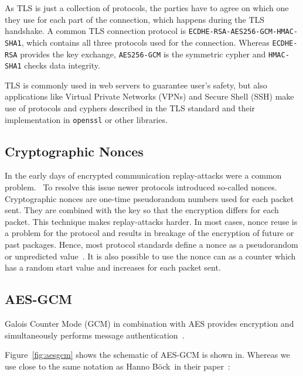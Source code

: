 As TLS is just a collection of protocols, the parties have to agree on which one
they use for each part of the connection, which happens during the TLS
handshake. A common TLS connection protocol is
\texttt{ECDHE-RSA-AES256-GCM-HMAC-SHA1}, which contains all three protocols used
for the connection. Whereas \texttt{ECDHE-RSA} provides the key exchange,
\texttt{AES256-GCM} is the  symmetric cypher and \texttt{HMAC-SHA1} checks data
integrity.

TLS is commonly used in web servers to guarantee user's safety, but also
applications like Virtual Private Networks (VPNs) and Secure Shell (SSH) make
use of protocols and cyphers described in the TLS standard and their
implementation in \texttt{openssl} or other libraries.


\subsection{Cryptographic Nonces}

In the early days of encrypted communication replay-attacks were a common
problem.~ To resolve this issue newer
protocols introduced so-called nonces. Cryptographic nonces are one-time
pseudorandom numbers used for each packet sent. They are combined with the key
so that the encryption differs for each packet. This technique makes
replay-attacks harder. In most cases, nonce reuse is a problem for the protocol
and results in breakage of the encryption of future or past packages. Hence,
most protocol standards define a nonce as a pseudorandom or unpredicted
value~\cite{noncegeneral}. It is also possible to use the nonce can as a counter
which has a random start value and increases for each packet sent.

\subsection{AES-GCM}

Galois Counter Mode (GCM) in combination with AES provides encryption and
simultaneously performs message authentication~\cite{gcm, gcmnist}.

Figure~\ref{fig:aesgcm} shows the schematic of AES-GCM is shown in. Whereas we
use close to the same notation as Hanno Böck~\etal in their
paper~\cite{gcmnonceattack}:


